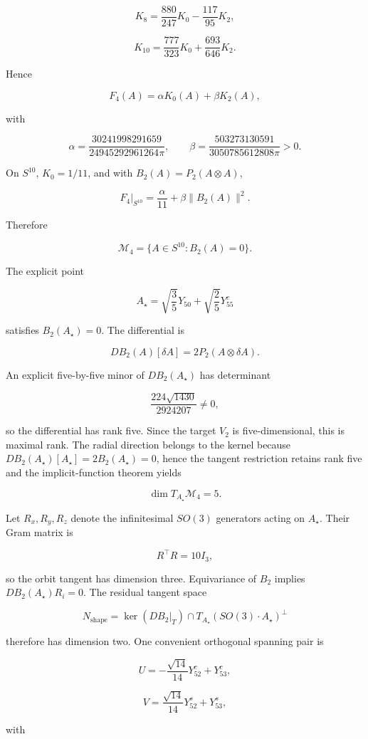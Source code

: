 \[
K_8=\frac{880}{247}K_0-\frac{117}{95}K_2,
\]

\[
K_{10}=\frac{777}{323}K_0+\frac{693}{646}K_2.
\]

Hence

\[
F_4(A)=\alpha K_0(A)+\beta K_2(A),
\]

with

\[
\alpha=\frac{30241998291659}{24945292961264\pi},
\qquad
\beta=\frac{503273130591}{3050785612808\pi}>0.
\]

On $S^{10}$, $K_0=1/11$, and with $B_2(A)=P_2(A\otimes A)$,

\[
F_4\big|_{S^{10}}=\frac\alpha{11}+\beta\|B_2(A)\|^2.
\]

Therefore

\[
\mathcal M_4=\{A\in S^{10}:B_2(A)=0\}.
\]

The explicit point

\[
A_\star=\sqrt{\frac35}Y_{50}+\sqrt{\frac25}Y^c_{55}
\]

satisfies $B_2(A_\star)=0$. The differential is

\[
DB_2(A)[\delta A]=2P_2(A\otimes\delta A).
\]

An explicit five-by-five minor of $DB_2(A_\star)$ has determinant

\[
\frac{224\sqrt{1430}}{2924207}\neq0,
\]

so the differential has rank five. Since the target $V_2$ is five-dimensional, this is maximal rank. The radial direction belongs to the kernel because $DB_2(A_\star)[A_\star]=2B_2(A_\star)=0$, hence the tangent restriction retains rank five and the implicit-function theorem yields

\[
\dim T_{A_\star}\mathcal M_4=5.
\]

Let $R_x,R_y,R_z$ denote the infinitesimal $SO(3)$ generators acting on $A_\star$. Their Gram matrix is

\[
R^\top R=10I_3,
\]

so the orbit tangent has dimension three. Equivariance of $B_2$ implies $DB_2(A_\star)R_i=0$. The residual tangent space

\[
N_{\mathrm{shape}}=\ker(DB_2|_T)\cap T_{A_\star}(SO(3)\cdot A_\star)^\perp
\]

therefore has dimension two. One convenient orthogonal spanning pair is

\[
U=-\frac{\sqrt{14}}{14}Y^c_{52}+Y^c_{53},
\]

\[
V=\frac{\sqrt{14}}{14}Y^s_{52}+Y^s_{53},
\]

with

